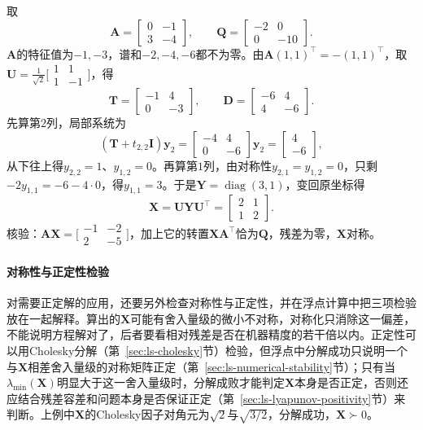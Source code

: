 \begin{example}[连续型方程的Schur求解]
\label{ex:ls-continuous-lyapunov-schur}
取
\[
 \bm A=\begin{bmatrix}0&-1\\3&-4\end{bmatrix},\qquad
 \bm Q=\begin{bmatrix}-2&0\\0&-10\end{bmatrix}.
\]
$\bm A$的特征值为$-1,-3$，谱和$-2,-4,-6$都不为零。由$\bm A(1,1)^\top=-(1,1)^\top$，取$\bm U=\tfrac1{\sqrt2}\bigl[\begin{smallmatrix}1&1\\1&-1\end{smallmatrix}\bigr]$，得
\[
 \bm T=\begin{bmatrix}-1&4\\0&-3\end{bmatrix},\qquad
 \bm D=\begin{bmatrix}-6&4\\4&-6\end{bmatrix}.
\]
先算第$2$列，局部系统为
\[
 (\bm T+t_{2,2}\bm I)\bm y_2=\begin{bmatrix}-4&4\\0&-6\end{bmatrix}\bm y_2=\begin{bmatrix}4\\-6\end{bmatrix},
\]
从下往上得$y_{2,2}=1$、$y_{1,2}=0$。再算第$1$列，由对称性$y_{2,1}=y_{1,2}=0$，只剩$-2y_{1,1}=-6-4\cdot0$，得$y_{1,1}=3$。于是$\bm Y=\operatorname{diag}(3,1)$，变回原坐标得
\[
 \bm X=\bm U\bm Y\bm U^\top=\begin{bmatrix}2&1\\1&2\end{bmatrix}.
\]
核验：$\bm A\bm X=\bigl[\begin{smallmatrix}-1&-2\\2&-5\end{smallmatrix}\bigr]$，加上它的转置$\bm X\bm A^\top$恰为$\bm Q$，残差为零，$\bm X$对称。
\end{example}

\paragraph{对称性与正定性检验}
对需要正定解的应用，还要另外检查对称性与正定性，并在浮点计算中把三项检验放在一起解释。算出的$\bm X$可能有舍入量级的微小不对称，对称化只消除这一偏差，不能说明方程解对了，后者要看相对残差是否在机器精度的若干倍以内。正定性可以用Cholesky分解（第~\ref{sec:ls-cholesky}节）检验，但浮点中分解成功只说明一个与$\bm X$相差舍入量级的对称矩阵正定（第~\ref{sec:ls-numerical-stability}节）；只有当$\lambda_{\min}(\bm X)$明显大于这一舍入量级时，分解成败才能判定$\bm X$本身是否正定，否则还应结合残差容差和问题本身是否保证正定（第~\ref{sec:ls-lyapunov-positivity}节）来判断。上例中$\bm X$的Cholesky因子对角元为$\sqrt2$与$\sqrt{3/2}$，分解成功，$\bm X\succ0$。

